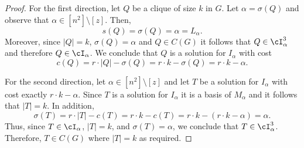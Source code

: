 {	\begin{proof}
		For the first direction, let $Q$ be a clique of size $k$ in $G$. Let $\alpha  = \sigma(Q)$ and observe that $\alpha \in [n^2] \setminus [z]$. Then, \begin{equation*}
			\label{eq:D2}
			s(Q) =\sigma(Q) = \alpha = L_{\alpha}. 
		\end{equation*} Moreover, since $|Q| = k$, $\sigma(Q) = \alpha$ and $Q \in C(G)$ it follows that $Q \in \cI^3_{\alpha}$ and therefore $Q \in \cI_{\alpha}$. We conclude that $Q$ is a solution for $I_{\alpha}$ with cost $$c(Q) = r \cdot |Q| - \sigma(Q) = r \cdot k - \sigma(Q) = r \cdot k - \alpha.$$ 
		
		For the second direction, let $\alpha \in [n^2] \setminus [z]$ and let $T$ be a solution for $I_{\alpha}$ with cost exactly $r \cdot k - \alpha$. Since $T$ is a solution for $I_{\alpha}$ it is a basis of $M_{\alpha}$ and it follows that $|T| = k$. 
		In addition, $$\sigma(T) = r \cdot |T|-c(T) = r \cdot k- c(T) = r \cdot k- (r \cdot k - \alpha) = \alpha.$$ Thus, since $T \in \cI_{\alpha}$, $|T| = k$, and $\sigma(T) = \alpha$, we conclude that $T \in \cI^3_{\alpha}$. Therefore, $T \in C(G)$ where $|T| = k$ as required.  
	\end{proof}
	
}
